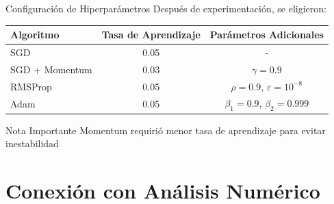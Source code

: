 \documentclass[10pt]{beamer}
\begin{document}
\begin{frame}{Configuración de Hiperparámetros}
Después de experimentación, se eligieron:

\begin{table}[ht]
\centering
\begin{tabular}{lcc}
\toprule
\textbf{Algoritmo} & \textbf{Tasa de Aprendizaje} & \textbf{Parámetros Adicionales} \\
\midrule
SGD & 0.05 & - \\
SGD + Momentum & 0.03 & $\gamma = 0.9$ \\
RMSProp & 0.05 & $\rho = 0.9$, $\varepsilon = 10^{-8}$ \\
Adam & 0.05 & $\beta_1 = 0.9$, $\beta_2 = 0.999$ \\
\bottomrule
\end{tabular}
\end{table}

\begin{alertblock}{Nota Importante}
Momentum requirió menor tasa de aprendizaje para evitar inestabilidad
\end{alertblock}
\end{frame}

\section{Conexión con Análisis Numérico}
\end{document}
